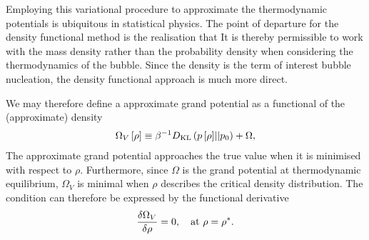 Employing this variational procedure to approximate the thermodynamic potentials is ubiquitous in statistical physics\cite{Yedidia2000a}.
The point of departure for the density functional method is the realisation that
It is thereby permissible to work with the mass density rather than the probability density when considering the thermodynamics of the bubble.
Since the density is the term of interest bubble nucleation, the density functional approach is much more direct.

We may therefore define a approximate grand potential as a functional of the (approximate) density \cite{Evans1992}
\begin{align}
 \Omega_V\left[ \rho \right] \equiv \beta^{-1}D_{\text {KL}}\left( {p\left[ \rho \right]}||{p_0} \right)+   \Omega, 
\end{align}
The approximate  grand potential approaches the true value when
it is minimised with  respect to $\rho$.
Furthermore, since $\Omega$ is the grand potential at thermodynamic equilibrium,
$\Omega_V$ is minimal when $\rho$ describes the  critical density distribution.
The condition 
can therefore be expressed by the functional derivative\cite{Oxtoby1992}
\begin{align}
  \frac{\delta \Omega_V}{\delta \rho} =0,\quad\text{at $\rho = {\rho^\ast}$.} \label{eqn:DFT:astar}
\end{align}


